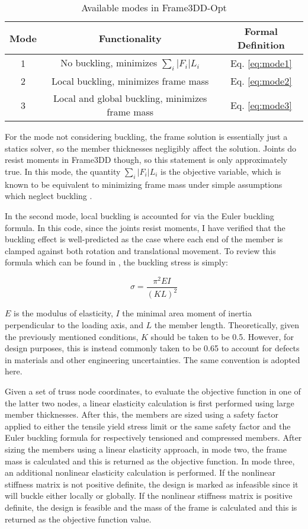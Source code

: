 \documentclass{article}
\begin{document}
\begin{table}
  \caption{Available modes in Frame3DD-Opt}
  \label{tab:modes}
  \centering
  \begin{tabular}{c|c|c}
    Mode & Functionality & Formal Definition \\
    \hline
    1 & No buckling, minimizes $\sum_i |F_i| L_i$ & Eq. \ref{eq:mode1} \\
    2 & Local buckling, minimizes frame mass & Eq. \ref{eq:mode2} \\
    3 & Local and global buckling, minimizes frame mass & Eq. \ref{eq:mode3} \\
  \end{tabular}
\end{table}

For the mode not considering buckling, the frame solution is essentially just a statics solver, so the member
thicknesses negligibly affect the solution. Joints do resist moments in Frame3DD though, so this statement is
only approximately true. In this mode, the quantity $\sum_i |F_i| L_i$ is the objective variable, which
is known to be equivalent to minimizing frame mass under simple assumptions which neglect buckling \cite{muellerComputationalExplorationStructural2014}.

In the second mode, local buckling is accounted for via the Euler buckling formula. In this code, since the
joints resist moments, I have verified that the buckling effect is well-predicted as the case where each end
of the member is clamped against both rotation and translational movement. To review this formula which can
be found in \cite{gereMechanicsMaterials1996}, the buckling stress is simply:

\begin{equation}
  \sigma = \frac{\pi^2 E I}{(K L)^2}
\end{equation}

$E$ is the modulus of elasticity, $I$ the minimal area moment of inertia perpendicular to the loading axis,
and $L$ the member length.
Theoretically, given the previously mentioned conditions, $K$ should be taken to be 0.5. However, for design
purposes, this is instead commonly taken to be 0.65 to account for defects in materials and other engineering
uncertainties. The same convention is adopted here.

Given a set of truss node coordinates, to evaluate the objective function in one of the latter two
nodes, a linear elasticity calculation is first performed using large member thicknesses. After this,
the members are sized using a safety factor applied to either the tensile yield stress limit or
the same safety factor and the Euler buckling formula for respectively tensioned and compressed members.
After sizing the members using a linear elasticity approach, in mode two, the frame mass is calculated
and this is returned as the objective function. In mode three, an additional nonlinear elasticity calculation
is performed. If the nonlinear stiffness matrix is not positive definite, the design is marked as infeasible
since it will buckle either locally or globally. If the nonlinear stiffness matrix is positive definite,
the design is feasible and the mass of the frame is calculated and this is returned as the objective
function value.
\end{document}
